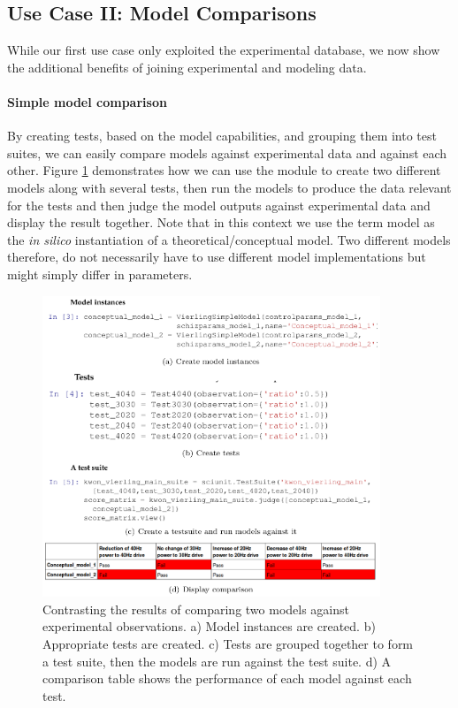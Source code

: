 \documentclass[CompPsych]{stjour}
\begin{document}
\subsection{Use Case II: Model Comparisons}

While our first use case only exploited the experimental database, we now show the additional benefits of joining experimental and modeling data. 

\paragraph{Simple model comparison}
By creating tests, based on the model capabilities, and grouping 
them into test suites, we can easily compare models against experimental data and against each other. Figure \ref{Fig:ModelComparisons} demonstrates how we can use the module to create two different models along with
several tests, then run the models to produce the data relevant for the tests and then judge the model outputs against experimental data and  display the result together. Note that in this context
we use the term model as the \textit{in silico} instantiation of a theoretical/conceptual model. Two different models therefore, do not necessarily have to use different model implementations but might simply differ in parameters.

\begin{figure}
\includegraphics[width=0.9\textwidth]{Figures/figure-model-comparison}
\caption{Contrasting the results of comparing two models against experimental observations. a) Model instances are created. b) Appropriate tests are created. c) Tests are grouped together to form a test suite, then the models
are run against the test suite. d) A comparison table shows the performance of each model against each test.}
\label{Fig:ModelComparisons}
\end{figure}
\end{document}
